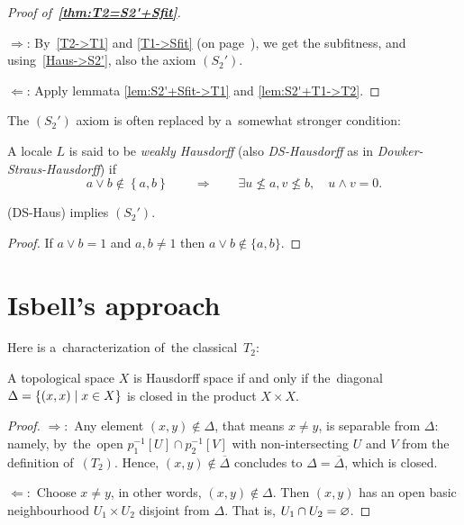 \begin{proof}[Proof of~{\bf\ref{thm:T2=S2'+Sfit}}]
  ~

  $\Rightarrow$:
  By~\ref{T2->T1} and \ref{T1->Sfit} (on page~\pageref{T1->Sfit}), we get the
  subfitness, and using~\ref{Haus->S2'}, also the axiom $(S_2')$.

  $\Leftarrow$:
  Apply lemmata \ref{lem:S2'+Sfit->T1} and \ref{lem:S2'+T1->T2}.
\end{proof}

The $(S_2')$ axiom is often replaced by a~somewhat stronger condition:

\begin{framed}
  \begin{df}[DS-Haus]
    A locale $L$ is said to be \emph{weakly Hausdorff\/} (also
    \emph{DS-Hausdorff} as in \emph{Dowker-Straus-Hausdorff}) if
    \[
      a \vee b \not\in \left\{a, b\right\} \qquad \Rightarrow \qquad \exists
      u\not\leq a, v\not\leq b, \quad u \wedge v = 0.
    \]
  \end{df}
\end{framed}

\begin{prop} \label{prop:DS-Haus->S2'}
  (DS-Haus) implies $(S_2')$.
\end{prop}
\begin{proof}
  If $a \vee b = 1$ and $a, b \ne 1$ then $a \vee b\not\in \{ a, b \}$.
\end{proof}

\section{Isbell's approach}

Here is a~characterization of~the classical~$T_2$:

\begin{prop}
  A topological space $X$ is Hausdorff space if and only if the~diagonal
  $\Delta = \left\{(x, x) \mid x\in X \right\}$ is closed in the product
  $X\times X$.
\end{prop}

\begin{proof}
  $\Rightarrow:$ Any element $(x, y)\not\in \Delta$, that means $x \ne y$, is
  separable from $\Delta$:
  namely, by~the~open $p_1^{-1}[U] \cap p_2^{-1}[V]$ with non-intersecting $U$
  and $V$ from the definition of~$(T_2)$.
  Hence, $(x, y)\not\in \overline{\Delta}$ concludes to $\Delta =
  \overline{\Delta}$, which is closed.

  $\Leftarrow:$ Choose $x \ne y$, in other words, $(x, y)\not\in \Delta$.
  Then $(x, y)$ has an open basic neighbourhood $U_1\times U_2$ disjoint from
  $\Delta$.
  That is, $U_1 \cap U_2 = \varnothing$.
\end{proof}

